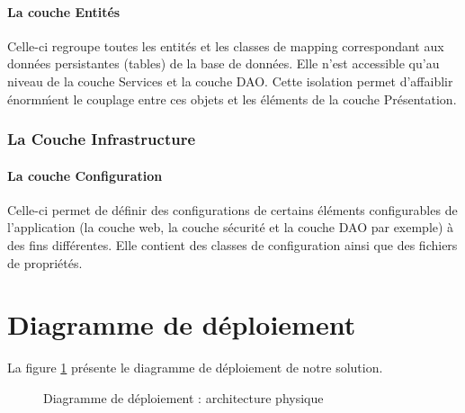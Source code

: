 \paragraph{La couche Entit\'es}
Celle-ci regroupe toutes les entit\'es et les classes de mapping correspondant aux donn\'ees persistantes (tables) de la base de donn\'ees. Elle n'est accessible qu'au niveau de la couche Services et la couche DAO. Cette isolation permet d'affaiblir \'enorm\'ment le couplage entre ces objets et les \'el\'ements de la couche Pr\'esentation.
\subsubsection*{La Couche Infrastructure}

\paragraph{La couche Configuration}
Celle-ci permet de d\'efinir des configurations de certains \'el\'ements configurables de l'application (la couche web, la couche s\'ecurit\'e et la couche DAO par exemple) \`a des fins diff\'erentes. Elle contient des classes de configuration
ainsi que des fichiers de propri\'et\'es.

\section {Diagramme de déploiement}
La figure \ref{fig:DeploymentDiagram1} présente le diagramme de déploiement de notre solution.  

\begin{figure}[!ht]\centering
{}
\caption{Diagramme de déploiement : architecture physique}
\label{fig:DeploymentDiagram1}
\end{figure}

